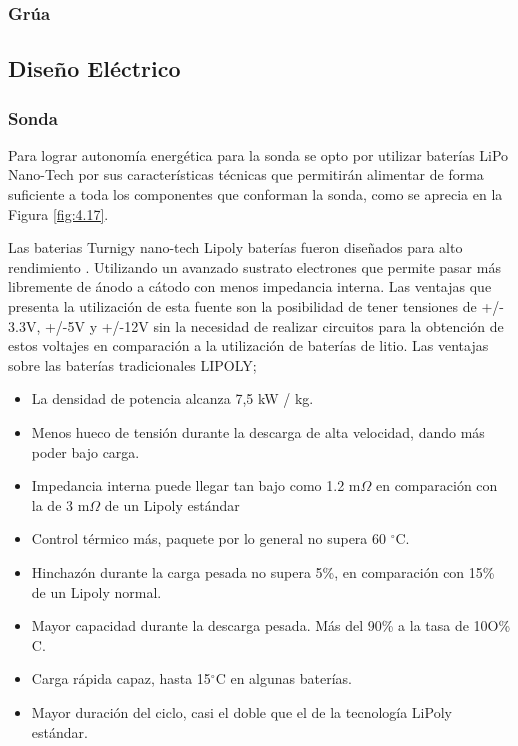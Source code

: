 \subsubsection[Gr\'ua ]{Gr\'ua}


\subsection[Dise\~no El\'ectrico]{Dise\~no El\'ectrico}
\subsubsection[Sonda]{Sonda}
Para lograr autonom\'ia energ\'etica para la sonda se opto por utilizar bater\'ias LiPo Nano-Tech por sus caracter\'isticas t\'ecnicas que permitir\'an alimentar de forma suficiente a toda los componentes que conforman la sonda, como se aprecia en la Figura \ref{fig:4.17}. 

Las baterias Turnigy nano-tech Lipoly bater\'ias fueron dise\~nados para alto rendimiento . Utilizando un avanzado sustrato electrones que permite pasar m\'as libremente de \'anodo a c\'atodo con menos impedancia interna.
 Las ventajas que presenta la utilización de esta fuente son la posibilidad de tener tensiones de +/- 3.3V, +/-5V y +/-12V sin la necesidad de realizar circuitos para la obtención de estos voltajes en comparación a la utilización de baterías de litio.
 \newline
 \hfill
Las ventajas sobre las bater\'ias tradicionales LIPOLY;
\begin{itemize}
    \item La densidad de potencia alcanza 7,5 kW / kg.
    \item Menos hueco de tensi\'on durante la descarga de alta velocidad, dando m\'as poder bajo carga.
    \item Impedancia interna puede llegar tan bajo como 1.2 m${\Omega }$ en comparación con la de 3 m${\Omega }$ de un Lipoly estándar
    \item Control t\'ermico m\'as, paquete por lo general no supera 60 $^{\circ}$C.
    \item Hinchazón durante la carga pesada no supera 5\%, en comparación con 15\% de un Lipoly normal.
    \item Mayor capacidad durante la descarga pesada. M\'as del 90\% a la tasa de 10O\% C.
    \item Carga r\'apida capaz, hasta 15$^{\circ}$C en algunas baterías.
    \item Mayor duraci\'on del ciclo, casi el doble que el de la tecnolog\'ia LiPoly est\'andar.
\end{itemize}


